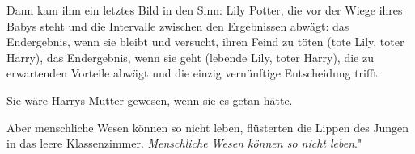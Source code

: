 Dann kam ihm ein letztes Bild in den Sinn: Lily Potter, die vor der Wiege ihres
Babys steht und die Intervalle zwischen den Ergebnissen abwägt: das Endergebnis,
wenn sie bleibt und versucht, ihren Feind zu töten (tote Lily, toter Harry), das
Endergebnis, wenn sie geht (lebende Lily, toter Harry), die zu erwartenden
Vorteile abwägt und die einzig vernünftige Entscheidung trifft.

Sie wäre Harrys Mutter gewesen, wenn sie es getan hätte.

\glqq Aber menschliche Wesen können so nicht leben\grqq{}, flüsterten die Lippen
des Jungen in das leere Klassenzimmer. \glqq \emph{Menschliche Wesen können so
nicht leben}."

